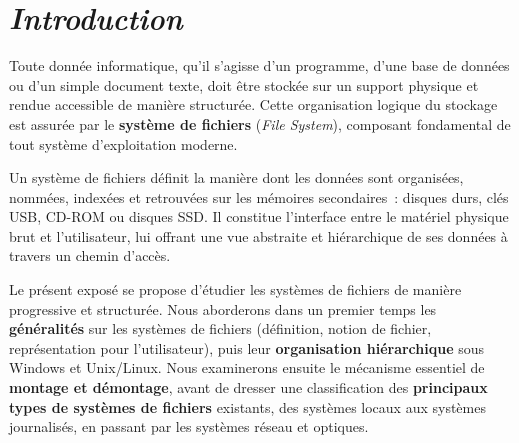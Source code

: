 \chapter*{\textit{Introduction}}
Toute donnée informatique, qu'il s'agisse d'un programme, d'une base de données ou d'un simple document texte, doit être stockée sur un support physique et rendue accessible de manière structurée. Cette organisation logique du stockage est assurée par le \textbf{système de fichiers} (\textit{File System}), composant fondamental de tout système d'exploitation moderne.

Un système de fichiers définit la manière dont les données sont organisées, nommées, indexées et retrouvées sur les mémoires secondaires~: disques durs, clés USB, CD-ROM ou disques SSD. Il constitue l'interface entre le matériel physique brut et l'utilisateur, lui offrant une vue abstraite et hiérarchique de ses données à travers un chemin d'accès.

Le présent exposé se propose d'étudier les systèmes de fichiers de manière progressive et structurée. Nous aborderons dans un premier temps les \textbf{généralités} sur les systèmes de fichiers (définition, notion de fichier, représentation pour l'utilisateur), puis leur \textbf{organisation hiérarchique} sous Windows et Unix/Linux. Nous examinerons ensuite le mécanisme essentiel de \textbf{montage et démontage}, avant de dresser une classification des \textbf{principaux types de systèmes de fichiers} existants, des systèmes locaux aux systèmes journalisés, en passant par les systèmes réseau et optiques.